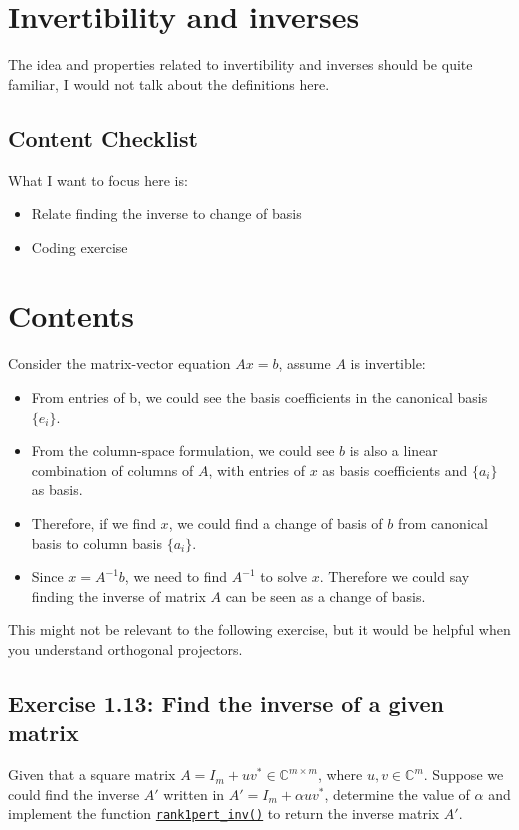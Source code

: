 \section{Invertibility and inverses}%
\label{sec1.6}
The idea and properties related to invertibility and inverses should be quite familiar, I would not talk about the definitions here. 
\subsection*{Content Checklist}
What I want to focus here is:
\begin{itemize}
  \item Relate finding the inverse to change of basis
  \item Coding exercise
\end{itemize}

\section*{Contents}
Consider the matrix-vector equation \(Ax = b\), assume \(A\) is invertible:
\begin{itemize}
  \item From entries of b, we could see the basis coefficients in the canonical basis $\{e_i\}$. 
  \item From the column-space formulation, we could see \(b\) is also a linear combination of columns of \(A\), with entries of \(x\) as basis coefficients and \(\{a_i\}\)  as basis. 
  \item Therefore, if we find \(x\), we could find a change of basis of \(b\)  from canonical basis to column basis \(\{a_i\}\).
  \item Since \(x = A^{-1}b\), we need to find \(A^{-1}\) to solve \(x\). Therefore we could say finding the inverse of matrix \(A\) can be seen as a change of basis.
\end{itemize}
This might not be relevant to the following exercise, but it would be helpful when you understand orthogonal projectors. \checked
\subsection*{Exercise 1.13: Find the inverse of a given matrix}%
\begin{problem}
  Given that a square matrix $A = I_m + uv^{*} \in \mathbb{C}^{m \times m}$, where $u, v \in \mathbb{C}^{m}$. Suppose we could find the inverse $A'$ written in  $A' = I_m + \alpha uv^{*}$, determine the value of $\alpha$ and implement the function \href{https://comp-lin-alg.github.io/cla_utils.html#cla_utils.exercises1.rank1pert_inv}{\texttt{rank1pert\_inv()}} to return the inverse matrix $A'$. \medskip
\end{problem}

